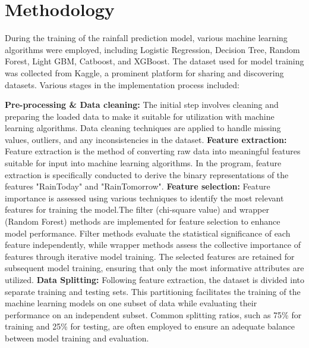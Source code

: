 \documentclass{josis}
\begin{document}
\section{Methodology}
During the training of the rainfall prediction model, various machine learning algorithms were employed, including Logistic Regression, Decision Tree, Random Forest, Light GBM, Catboost, and XGBoost. The dataset used for model training was collected from Kaggle, a prominent platform for sharing and discovering datasets. Various stages in the implementation process included:
\begin{description}
\textbf{Pre-processing \& Data cleaning:} The initial step involves cleaning and preparing the loaded data to make it suitable for utilization with machine learning algorithms.
Data cleaning techniques are applied to handle missing values, outliers, and any inconsistencies in the dataset.
\newline
\textbf{Feature extraction:} Feature extraction is the method of converting raw data into meaningful features suitable for input into machine learning algorithms. In the program, feature extraction is specifically conducted to derive the binary representations of the features "RainToday" and "RainTomorrow".
\newline
\textbf{Feature selection:} Feature importance is assessed using various techniques to identify the most relevant features for training the model.The filter (chi-square value) and wrapper (Random Forest) methods are implemented for feature selection to enhance model performance.
Filter methods evaluate the statistical significance of each feature independently, while wrapper methods assess the collective importance of features through iterative model training.
The selected features are retained for subsequent model training, ensuring that only the most informative attributes are utilized.
\newline
\textbf{Data Splitting:} Following feature extraction, the dataset is divided into separate training and testing sets.
This partitioning facilitates the training of the machine learning models on one subset of data while evaluating their performance on an independent subset.
Common splitting ratios, such as 75\% for training and 25\% for testing, are often employed to ensure an adequate balance between model training and evaluation.
\newline

\end{description}
\end{document}
